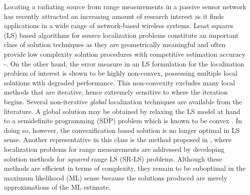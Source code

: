 Locating a radiating source from range measurements in a passive sensor network has recently attracted an increasing amount of research interest as it finds applications in a wide range of network-based wireless systems. Least squares (LS) based algorithms for source localization problems constitute an important class of solution techniques as they are geometrically meaningful and often provide low complexity solution procedures with competitive  estimation accuracy \cite{Chan}-\cite{BeckStLi}.  On the other hand, the error measure in an LS formulation for the localization problem of interest is shown to be highly non-convex, possessing multiple local solutions with degraded performance. This non-convexity excludes many local methods that are iterative, hence extremely sensitive to where the iteration begins. Several non-iterative \textit{global}  localization techniques are available from the literature. 
A global solution may be obtained by relaxing the LS model at hand to a semidefinite programming (SDP) problem which is known to be convex \cite{VBoyd}. In doing so, however, the convexification based solution is no longer optimal in LS sense. Another representative in this class is the method proposed in \cite{BeckStLi}, where localization problems for  range measurements are addressed by developing solution methods for \textit{squared} range LS (SR-LS) problems. Although these methods are efficient in terms of complexity, they remain to be suboptimal in the maximum likelihood (ML) sense because the solutions produced are merely approximations of the ML estimate.

